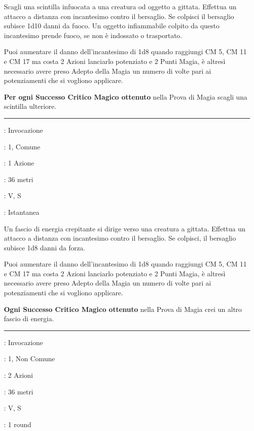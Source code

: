 \begin{multicols}{2}
Scagli una scintilla infuocata a una creatura od oggetto a gittata. Effettua un attacco a distanza con incantesimo contro il bersaglio. Se colpisci il bersaglio subisce 1d10 danni da fuoco. Un oggetto infiammabile colpito da questo incantesimo prende fuoco, se non è indossato o trasportato.

Puoi aumentare il danno dell'incantesimo di 1d8 quando raggiungi CM 5, CM 11 e CM 17 ma costa 2 Azioni lanciarlo potenziato e 2 Punti Magia, è altresì necessario avere preso Adepto della Magia un numero di volte pari ai potenziamenti che si vogliono applicare.

\textbf{Per ogni Successo Critico Magico ottenuto} nella Prova di Magia scagli una scintilla ulteriore.

\smallskip\noindent\rule{\linewidth}{2pt} \hypertarget{Dardo occulto}{}\medskip{}
\noindent
\begin{description}[noitemsep, topsep=0pt, parsep=0pt, partopsep=0pt, leftmargin=0cm, labelwidth=2.8cm]
	\item[\textbf{Lista di Magia}]: Invocazione
	\item[\textbf{Livello}]: 1, Comune
	\item[\textbf{T. di Lancio}]: 1 Azione
	\item[\textbf{Gittata}]: 36 metri
	\item[\textbf{Componenti}]: V, S
	\item[\textbf{Durata}]: Istantanea
\end{description}

Un fascio di energia crepitante si dirige verso una creatura a gittata. Effettua un attacco a distanza con incantesimo contro il bersaglio. Se colpisci, il bersaglio subisce 1d8 danni da forza.

Puoi aumentare il danno dell'incantesimo di 1d8 quando raggiungi CM 5, CM 11 e CM 17 ma costa 2 Azioni lanciarlo potenziato e 2 Punti Magia, è altresì necessario avere preso Adepto della Magia un numero di volte pari ai potenziamenti che si vogliono applicare.

\textbf{Ogni Successo Critico Magico ottenuto} nella Prova di Magia crei un altro fascio di energia.

\smallskip\noindent\rule{\linewidth}{2pt} \hypertarget{Dardo Tracciante}{}\medskip{}
\noindent
\begin{description}[noitemsep, topsep=0pt, parsep=0pt, partopsep=0pt, leftmargin=0cm, labelwidth=2.8cm]
	\item[\textbf{Lista di Magia}]: Invocazione
	\item[\textbf{Livello}]: 1, Non Comune
	\item[\textbf{T. di Lancio}]: 2 Azioni
	\item[\textbf{Gittata}]: 36 metri
	\item[\textbf{Componenti}]: V, S
	\item[\textbf{Durata}]: 1 round
\end{description}


\end{multicols}
